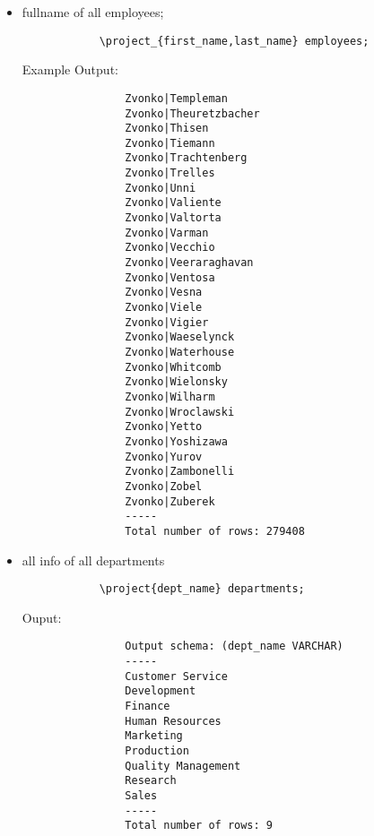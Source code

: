 \documentclass[12pt, letterpaper, twoside]{article}
\begin{document}
	\newpage
	\begin{itemize}
		\item fullname of all employees;
		\begin{verbatim}
			\project_{first_name,last_name} employees;
		\end{verbatim}
		\quad Example Output:
		\begin{verbatim}
				Zvonko|Templeman
				Zvonko|Theuretzbacher
				Zvonko|Thisen
				Zvonko|Tiemann
				Zvonko|Trachtenberg
				Zvonko|Trelles
				Zvonko|Unni
				Zvonko|Valiente
				Zvonko|Valtorta
				Zvonko|Varman
				Zvonko|Vecchio
				Zvonko|Veeraraghavan
				Zvonko|Ventosa
				Zvonko|Vesna
				Zvonko|Viele
				Zvonko|Vigier
				Zvonko|Waeselynck
				Zvonko|Waterhouse
				Zvonko|Whitcomb
				Zvonko|Wielonsky
				Zvonko|Wilharm
				Zvonko|Wroclawski
				Zvonko|Yetto
				Zvonko|Yoshizawa
				Zvonko|Yurov
				Zvonko|Zambonelli
				Zvonko|Zobel
				Zvonko|Zuberek
				-----
				Total number of rows: 279408

		\end{verbatim}
	\end{itemize}
	
	\newpage
	
	\begin{itemize}
		\item all info of all departments
		\begin{verbatim}
			\project{dept_name} departments;
		\end{verbatim}
		\quad Ouput:
		\begin{verbatim}
				Output schema: (dept_name VARCHAR)
				-----
				Customer Service
				Development
				Finance
				Human Resources
				Marketing
				Production
				Quality Management
				Research
				Sales
				-----
				Total number of rows: 9

		\end{verbatim}		 
	\end{itemize}
\end{document}

